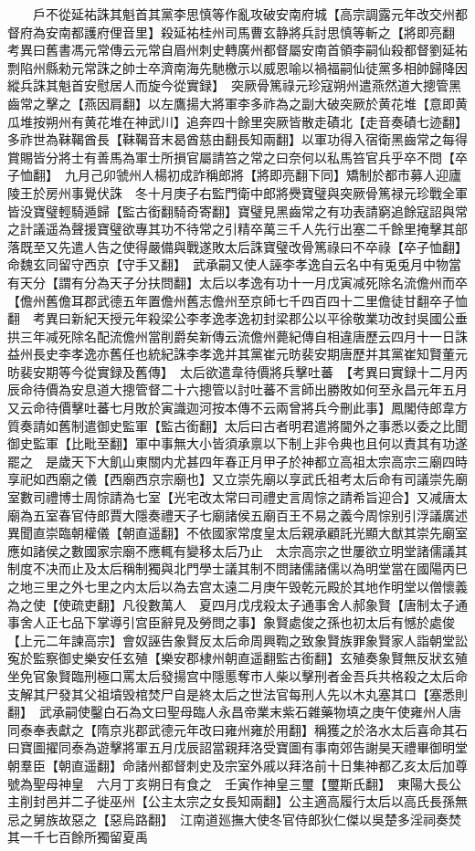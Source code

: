 　　戶不從延祐誅其魁首其黨李思慎等作亂攻破安南府城【高宗調露元年改交州都督府為安南都護府俚音里】殺延祐桂州司馬曹玄静將兵討思慎等斬之【將即亮翻　考異曰舊書馮元常傳云元常自眉州刺史轉廣州都督屬安南首領李嗣仙殺都督劉延祐剽陷州縣勑元常誅之帥士卒濟南海先馳檄示以威恩喻以禍福嗣仙徒黨多相帥歸降因縱兵誅其魁首安慰居人而旋今從實録】　突厥骨篤祿元珍寇朔州遣燕然道大摠管黑齒常之擊之【燕因肩翻】以左鷹揚大將軍李多祚為之副大破突厥於黄花堆【意即黄瓜堆按朔州有黄花堆在神武川】追奔四十餘里突厥皆散走磧北【走音奏磧七迹翻】多祚世為靺鞨酋長【靺鞨音末曷酋慈由翻長知兩翻】以軍功得入宿衛黑齒常之每得賞賜皆分將士有善馬為軍士所損官屬請笞之常之曰奈何以私馬笞官兵乎卒不問【卒子恤翻】　九月己卯虢州人楊初成詐稱郎將【將即亮翻下同】矯制於都市募人迎廬陵王於房州事覺伏誅　冬十月庚子右監門衛中郎將㸑寶璧與突厥骨篤禄元珍戰全軍皆没寶璧輕騎遁歸【監古銜翻騎奇寄翻】寶璧見黑齒常之有功表請窮追餘寇詔與常之計議遥為聲援寶璧欲專其功不待常之引精卒萬三千人先行出塞二千餘里掩擊其部落既至又先遣人告之使得嚴備與戰遂敗太后誅寶璧改骨篤祿曰不卒祿【卒子恤翻】　命魏玄同留守西京【守手又翻】　武承嗣又使人誣李孝逸自云名中有兎兎月中物當有天分【謂有分為天子分扶問翻】太后以孝逸有功十一月戊寅减死除名流儋州而卒【儋州舊儋耳郡武德五年置儋州舊志儋州至京師七千四百四十二里儋徒甘翻卒子恤翻　考異曰新紀天授元年殺梁公李孝逸孝逸初封梁郡公以平徐敬業功改封吳國公垂拱三年减死除名配流儋州當削爵矣新傳云流儋州薨紀傳自相違唐歷云四月十一日誅益州長史李孝逸亦舊任也統紀誅李孝逸并其黨崔元昉裴安期唐歷并其黨崔知賢董元昉裴安期等今從實録及舊傳】　太后欲遣韋待價將兵擊吐蕃　【考異曰實録十二月丙辰命待價為安息道大摠管督二十六摠管以討吐蕃不言師出勝敗如何至永昌元年五月又云命待價擊吐蕃七月敗於寅識迦河按本傳不云兩曾將兵今刪此事】鳳閣侍郎韋方質奏請如舊制遣御史監軍【監古銜翻】太后曰古者明君遣將閫外之事悉以委之比聞御史監軍【比毗至翻】軍中事無大小皆須承禀以下制上非令典也且何以責其有功遂罷之　是歲天下大飢山東關内尤甚四年春正月甲子於神都立高祖太宗高宗三廟四時享祀如西廟之儀【西廟西京宗廟也】又立崇先廟以享武氏祖考太后命有司議崇先廟室數司禮博士周悰請為七室【光宅改太常曰司禮史言周悰之請希旨迎合】又减唐太廟為五室春官侍郎賈大隱奏禮天子七廟諸侯五廟百王不易之義今周悰别引浮議廣述異聞直崇臨朝權儀【朝直遥翻】不依國家常度皇太后親承顧託光顯大猷其崇先廟室應如諸侯之數國家宗廟不應輒有變移太后乃止　太宗高宗之世屢欲立明堂諸儒議其制度不决而止及太后稱制獨與北門學士議其制不問諸儒諸儒以為明堂當在國陽丙巳之地三里之外七里之内太后以為去宫太遠二月庚午毁乾元殿於其地作明堂以僧懷義為之使【使疏吏翻】凡役數萬人　夏四月戊戌殺太子通事舍人郝象賢【唐制太子通事舍人正七品下掌導引宫臣辭見及勞問之事】象賢處俊之孫也初太后有憾於處俊【上元二年諫高宗】會奴誣告象賢反太后命周興鞫之致象賢族罪象賢家人詣朝堂訟寃於監察御史樂安任玄殖【樂安郡棣州朝直遥翻監古銜翻】玄殖奏象賢無反狀玄殖坐免官象賢臨刑極口罵太后發揚宫中隱慝奪市人柴以擊刑者金吾兵共格殺之太后命支解其尸發其父祖墳毁棺焚尸自是終太后之世法官每刑人先以木丸塞其口【塞悉則翻】　武承嗣使鑿白石為文曰聖母臨人永昌帝業末紫石雜藥物填之庚午使雍州人唐同泰奉表獻之【隋京兆郡武德元年改曰雍州雍於用翻】稱獲之於洛水太后喜命其石曰寶圖擢同泰為遊擊將軍五月戊辰詔當親拜洛受寶圖有事南郊告謝昊天禮畢御明堂朝羣臣【朝直遥翻】命諸州都督刺史及宗室外戚以拜洛前十日集神都乙亥太后加尊號為聖母神皇　六月丁亥朔日有食之　壬寅作神皇三璽【璽斯氏翻】　東陽大長公主削封邑并二子徙巫州【公主太宗之女長知兩翻】公主適高履行太后以高氏長孫無忌之舅族故惡之【惡烏路翻】　江南道廵撫大使冬官侍郎狄仁傑以吳楚多淫祠奏焚其一千七百餘所獨留夏禹